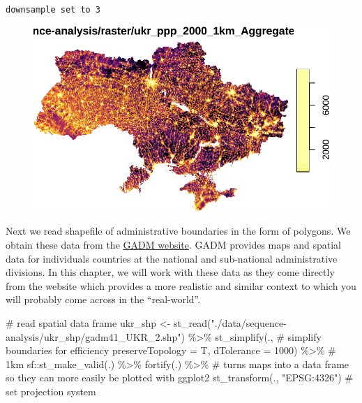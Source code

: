 \documentclass[
  letterpaper,
  DIV=11,
  numbers=noendperiod]{scrreprt}
\newenvironment{Shaded}{\begin{snugshade}}{\end{snugshade}}
\newcommand{\AttributeTok}[1]{\textcolor[rgb]{0.40,0.45,0.13}{#1}}
\newcommand{\CommentTok}[1]{\textcolor[rgb]{0.37,0.37,0.37}{#1}}
\newcommand{\DecValTok}[1]{\textcolor[rgb]{0.68,0.00,0.00}{#1}}
\newcommand{\FunctionTok}[1]{\textcolor[rgb]{0.28,0.35,0.67}{#1}}
\newcommand{\NormalTok}[1]{\textcolor[rgb]{0.00,0.23,0.31}{#1}}
\newcommand{\OtherTok}[1]{\textcolor[rgb]{0.00,0.23,0.31}{#1}}
\newcommand{\SpecialCharTok}[1]{\textcolor[rgb]{0.37,0.37,0.37}{#1}}
\newcommand{\StringTok}[1]{\textcolor[rgb]{0.13,0.47,0.30}{#1}}
\begin{document}
\begin{verbatim}
downsample set to 3
\end{verbatim}

\begin{figure}[H]

{\centering \includegraphics{sequence-analysis_files/figure-pdf/unnamed-chunk-6-1.pdf}

}

\end{figure}

Next we read shapefile of administrative boundaries in the form of
polygons. We obtain these data from the \href{https://gadm.org}{GADM
website}. GADM provides maps and spatial data for individuals countries
at the national and sub-national administrative divisions. In this
chapter, we will work with these data as they come directly from the
website which provides a more realistic and similar context to which you
will probably come across in the ``real-world''.

\begin{Shaded}
\begin{Highlighting}[]
\CommentTok{\# read spatial data frame}
\NormalTok{ukr\_shp }\OtherTok{\textless{}{-}} \FunctionTok{st\_read}\NormalTok{(}\StringTok{"./data/sequence{-}analysis/ukr\_shp/gadm41\_UKR\_2.shp"}\NormalTok{) }\SpecialCharTok{\%\textgreater{}\%} 
  \FunctionTok{st\_simplify}\NormalTok{(., }\CommentTok{\# simplify boundaries for efficiency}
              \AttributeTok{preserveTopology =}\NormalTok{ T,}
              \AttributeTok{dTolerance =} \DecValTok{1000}\NormalTok{) }\SpecialCharTok{\%\textgreater{}\%}  \CommentTok{\# 1km}
\NormalTok{  sf}\SpecialCharTok{::}\FunctionTok{st\_make\_valid}\NormalTok{(.) }\SpecialCharTok{\%\textgreater{}\%} 
  \FunctionTok{fortify}\NormalTok{(.) }\SpecialCharTok{\%\textgreater{}\%}  \CommentTok{\# turns maps into a data frame so they can more easily be plotted with ggplot2}
  \FunctionTok{st\_transform}\NormalTok{(., }\StringTok{"EPSG:4326"}\NormalTok{) }\CommentTok{\# set projection system}
\end{Highlighting}
\end{Shaded}
\end{document}
